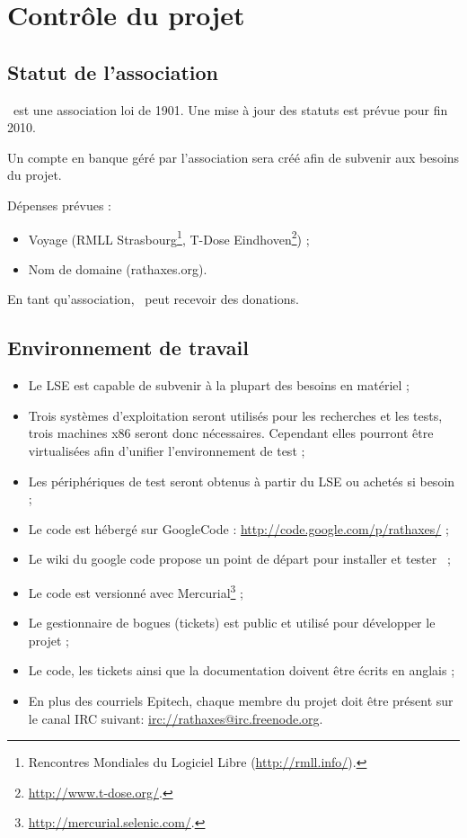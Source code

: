 \documentclass[chapterprefix=off]{rtxreport}
\begin{document}
\chapter{Contrôle du projet}

\section{Statut de l'association}

\rtx\ est une association loi de 1901. Une mise à jour des statuts est
prévue pour fin 2010.

Un compte en banque géré par l'association sera créé afin de subvenir aux
besoins du projet.

Dépenses prévues :
\begin{itemize}
\item Voyage (RMLL Strasbourg\footnote{Rencontres Mondiales du Logiciel
Libre (\url{http://rmll.info/}).}, T-Dose
Eindhoven\footnote{\url{http://www.t-dose.org/}.}) ;
\item Nom de domaine (rathaxes.org).
\end{itemize}

En tant qu'association, \rtx\ peut recevoir des donations.

\section{Environnement de travail}

\begin{itemize}
\item Le LSE est capable de subvenir à la plupart des besoins en matériel ;
\item Trois systèmes d'exploitation seront utilisés pour les recherches et les
tests, trois machines x86 seront donc nécessaires. Cependant elles pourront
être virtualisées afin d'unifier l'environnement de test ;
\item Les périphériques de test seront obtenus à partir du LSE ou achetés si
besoin ;
\item Le code est hébergé sur GoogleCode : \url{http://code.google.com/p/rathaxes/} ;
\item Le wiki du google code propose un point de départ pour installer et
tester \rtx\ ;
\item Le code est versionné avec
Mercurial\footnote{\url{http://mercurial.selenic.com/}.} ;
\item Le gestionnaire de bogues (tickets) est public et utilisé pour développer
le projet ;
\item Le code, les tickets ainsi que la documentation doivent être écrits en
anglais ;
\item En plus des courriels Epitech, chaque membre du projet doit être présent
sur le canal IRC suivant: \url{irc://rathaxes@irc.freenode.org}.
\end{itemize}
\end{document}
